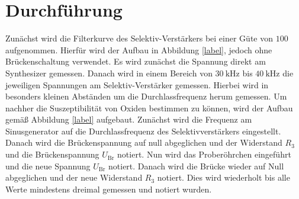 
\section{Durchführung}
\label{sec:Durchführung}

Zunächst wird die Filterkurve des Selektiv-Verstärkers bei einer Güte von $100$ aufgenommen. Hierfür wird der Aufbau in Abbildung \ref{label}, jedoch ohne Brückenschaltung verwendet. Es wird zunächst die Spannung direkt am Synthesizer gemessen. Danach wird in einem Bereich von $\SI{30}{\kilo\hertz}$ bis $\SI{40}{\kilo\hertz}$ die jeweiligen Spannungen am Selektiv-Verstärker gemessen. Hierbei wird in besonders kleinen Abständen um die Durchlassfrequenz herum gemessen. Um nachher die Suszeptibilität von Oxiden bestimmen zu können, wird der Aufbau gemäß Abbildung \ref{label} aufgebaut. Zunächst wird die Frequenz am Sinusgenerator auf die Durchlassfrequenz des Selektivverstärkers eingestellt. Danach wird die Brückenspannung auf null abgeglichen und der Widerstand $R_3$ und die Brückenspannung $U_\text{Br}$ notiert. Nun wird das Proberöhrchen eingeführt und die neue Spannung $U_\text{Br}$ notiert. Danach wird die Brücke wieder auf Null abgeglichen und der neue Widerstand $R_3$ notiert. Dies wird wiederholt bis alle Werte mindestens dreimal gemessen und notiert wurden. 